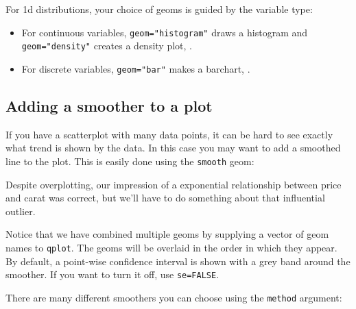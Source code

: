 For 1d distributions, your choice of geoms is guided by the variable type:

\begin{itemize}
	\item For continuous variables, {\tt geom="histogram"} draws a histogram and {\tt geom="density"} creates a density plot, .

  \item For discrete variables, {\tt geom="bar"} makes a barchart, .

\end{itemize}



\subsection{Adding a smoother to a plot}\label{sub:smooth}

If you have a scatterplot with many data points, it can be hard to see exactly what trend is shown by the data.  In this case you may want to add a smoothed line to the plot.  This is easily done using the {\tt smooth} geom:

% 


Despite overplotting, our impression of a exponential relationship between price and carat was correct, but we'll have to do something about that influential outlier.  

Notice that we have combined multiple geoms by supplying a vector of geom names to {\tt qplot}.  The geoms will be overlaid in the order in which they appear.  By default, a point-wise confidence interval is shown with a grey band around the smoother.  If you want to turn it off, use {\tt se=FALSE}.

There are many different smoothers you can choose using the {\tt method} argument:

